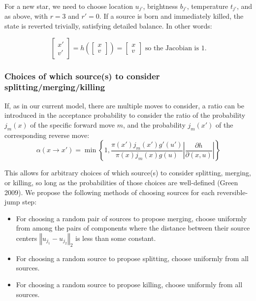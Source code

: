 \documentclass[11pt]{article}
\begin{document}
For a new star, we need to choose location $u_{j'}$, brightness
$b_{j'}$, temperature $t_{j'}$, and as above, with $r=3$ and $r'=0$. If a source is
born and immediately killed, the state is reverted trivially, satisfying
detailed balance. In other words:

\[
\begin{bmatrix}x'\\
v'
\end{bmatrix}=h\left(\begin{bmatrix}x\\
v
\end{bmatrix}\right)=\begin{bmatrix}x\\
v
\end{bmatrix}\mbox{ so the Jacobian is }1.
\]



\subsubsection{Choices of which source(s) to consider splitting/merging/killing\label{sub:proposal-choice}}

If, as in our current model, there are multiple moves to consider,
a ratio can be introduced in the acceptance probability to consider
the ratio of the probability $j_{m}\left(x\right)$ of the specific
forward move $m$, and the probability $j_{m}\left(x'\right)$ of
the corresponding reverse move:
\[
\alpha\left(x\to x'\right)=\min\left\{ 1,\frac{\pi\left(x'\right)j_{m}\left(x'\right)g'\left(u'\right)}{\pi\left(x\right)j_{m}\left(x\right)g\left(u\right)}\left|\frac{\partial h}{\partial\left(x,u\right)}\right|\right\} 
\]


This allows for arbitrary choices of which source(s) to consider splitting,
merging, or killing, so long as the probabilities of those choices
are well-defined (Green 2009). We propose the following methods of
choosing sources for each reversible-jump step:
\begin{itemize}
\item For choosing a random pair of sources to propose merging, choose uniformly
from among the pairs of components where the distance between their
source centers $\left\Vert u_{j_{1}}-u_{j_{2}}\right\Vert _{2}$
is less than some constant. 
\item For choosing a random source to propose splitting, choose uniformly
from all sources.
\item For choosing a random source to propose killing, choose uniformly
from all sources. %

\end{itemize}
\end{document}
